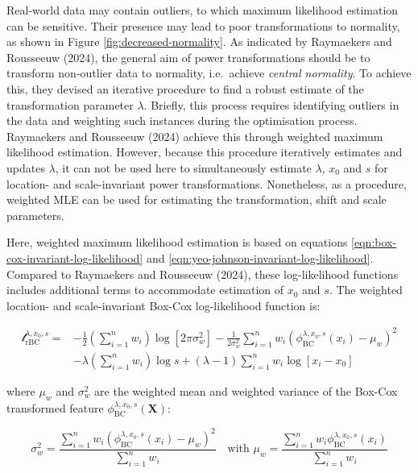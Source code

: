 \documentclass[preprint,12pt,authoryear]{elsarticle}
\begin{document}
Real-world data may contain outliers, to which maximum likelihood
estimation can be sensitive. Their presence may lead to poor
transformations to normality, as shown in Figure
\ref{fig:decreased-normality}. As indicated by Raymaekers and Rousseeuw
(2024), the general aim of power transformations should be to transform
non-outlier data to normality, i.e.~achieve \emph{central normality}. To
achieve this, they devised an iterative procedure to find a robust
estimate of the transformation parameter \(\lambda\). Briefly, this
process requires identifying outliers in the data and weighting such
instances during the optimisation process. Raymaekers and Rousseeuw
(2024) achieve this through weighted maximum likelihood estimation.
However, because this procedure iteratively estimates and updates
\(\lambda\), it can not be used here to simultaneously estimate
\(\lambda\), \(x_0\) and \(s\) for location- and scale-invariant power
transformations. Nonetheless, as a procedure, weighted MLE can be used
for estimating the transformation, shift and scale parameters.

Here, weighted maximum likelihood estimation is based on equations
\ref{eqn:box-cox-invariant-log-likelihood} and
\ref{eqn:yeo-johnson-invariant-log-likelihood}. Compared to Raymaekers
and Rousseeuw (2024), these log-likelihood functions includes additional
terms to accommodate estimation of \(x_0\) and \(s\). The weighted
location- and scale-invariant Box-Cox log-likelihood function is:

\begin{equation}
\label{eqn:box-cox-weighted-invariant-log-likelihood}
\begin{split}
\mathcal{l}_{\text{rBC}}^{\lambda, x_0, s} = & -\frac{1}{2} \left(\sum_{i=1}^n w_i \right) \log \left[ 2 \pi \sigma_w^2 \right] -\frac{1}{2 \sigma_w^2} \sum_{i=1}^n w_i \left( \phi_{\text{BC}}^{\lambda, x_0, s}(x_i) - \mu_w \right)^2 \\
& - \lambda \left( \sum_{i=1}^n w_i \right) \log s + \left( \lambda - 1 \right) \sum_{i=1}^n w_i \log \left[ x_i - x_0 \right]
\end{split}
\end{equation}

where \(\mu_w\) and \(\sigma^2_w\) are the weighted mean and weighted
variance of the Box-Cox transformed feature
\(\phi_{\text{BC}}^{\lambda, x_0, s} (\mathbf{X})\):

\begin{equation}
\sigma_w^2 = \frac{\sum_{i=1}^n w_i \left(\phi_{\text{BC}}^{\lambda, x_0, s} (x_i) - \mu_w \right)^2}{\sum_{i=1}^n w_i} \quad \text{with } \mu_w = \frac{\sum_{i=1}^n w_i \phi_{\text{BC}}^{\lambda, x_0, s} (x_i)} {\sum_{i=1}^n w_i}
\end{equation}
\end{document}
